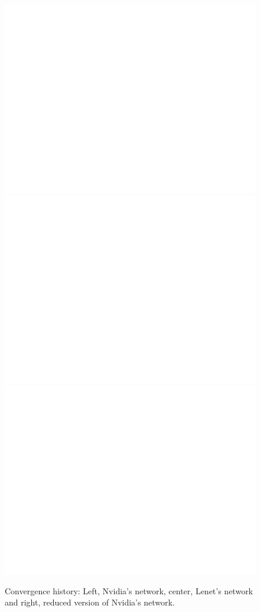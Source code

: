 \documentclass[12pt,a4paper]{article}
\begin{document}
	
	\begin{figure}[h]
		\centering
		\includegraphics[width=0.3\linewidth]{writeup_figures/nvidia_convergence_history}
		\includegraphics[width=0.3\linewidth]{writeup_figures/lenet_convergence_history}		\includegraphics[width=0.3\linewidth]{writeup_figures/nvidia_reduced_convergence_history}
		\caption{Convergence history: Left, Nvidia's network, center, Lenet's network and right, reduced version of Nvidia's network.}
		\label{fig:models}
	\end{figure}
\end{document}
